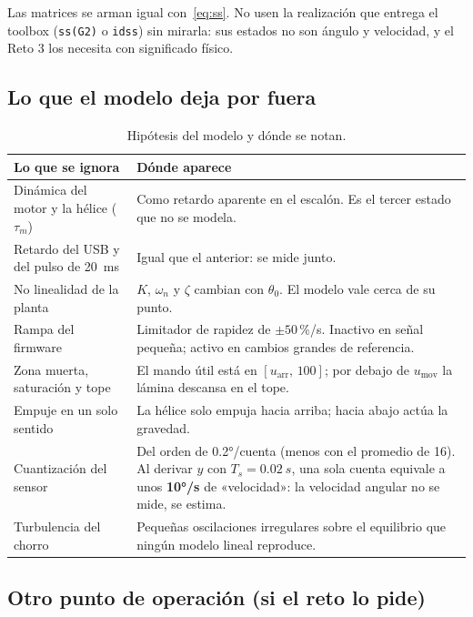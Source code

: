 \documentclass[11pt,letterpaper]{article}
\begin{document}
Las matrices se arman igual con~\eqref{eq:ss}. No usen la realización que entrega el toolbox (\texttt{ss(G2)} o \texttt{idss}) sin mirarla: sus estados no son ángulo y velocidad, y el Reto 3 los necesita con significado físico.

\subsection{Lo que el modelo deja por fuera}\label{sec:nomodela}

\begin{table}[H]\centering\small
\caption{Hipótesis del modelo y dónde se notan.}\label{tab:hipotesis}
\begin{tabularx}{\linewidth}{@{}>{\raggedright\arraybackslash}p{3.9cm} >{\raggedright\arraybackslash}X@{}}\toprule
\textbf{Lo que se ignora} & \textbf{Dónde aparece}\\\midrule
Dinámica del motor y la hélice ($\tau_m$) & Como retardo aparente en el escalón. Es el tercer estado que no se modela.\\
Retardo del USB y del pulso de \SI{20}{ms} & Igual que el anterior: se mide junto.\\
No linealidad de la planta & $K$, $\omega_n$ y $\zeta$ cambian con $\theta_0$. El modelo vale cerca de su punto.\\
Rampa del firmware & Limitador de rapidez de $\pm50$\,\%/s. Inactivo en señal pequeña; activo en cambios grandes de referencia.\\
Zona muerta, saturación y tope & El mando útil está en $[u_\text{arr},\,100]$; por debajo de $u_\text{mov}$ la lámina descansa en el tope.\\
Empuje en un solo sentido & La hélice solo empuja hacia arriba; hacia abajo actúa la gravedad.\\
Cuantización del sensor & Del orden de 0.2°/cuenta (menos con el promedio de 16). Al derivar $y$ con $T_s=\SI{0.02}{s}$, una sola cuenta equivale a unos \textbf{10°/s} de «velocidad»: la velocidad angular no se mide, se estima.\\
Turbulencia del chorro & Pequeñas oscilaciones irregulares sobre el equilibrio que ningún modelo lineal reproduce.\\\bottomrule
\end{tabularx}
\end{table}

\subsection{Otro punto de operación (si el reto lo pide)}
\end{document}
